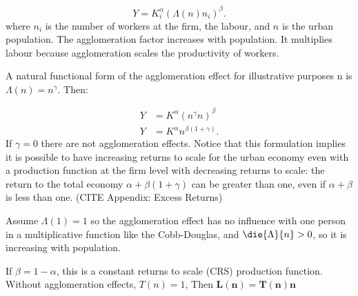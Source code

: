 \begin{equation} 
Y=K_i^{\alpha }(\Lambda(n)n_i)^{\beta }.
\label{Eqn:Prod1}
\end{equation} 
where $n_i$ is the number of workers at the firm, the labour, and $n$ is the urban population. The agglomeration factor increases with population. It multiplies labour because agglomeration scales the productivity of workers. 

A natural functional form of the agglomeration effect for illustrative purposes n is $\Lambda(n) = n^\gamma$. Then:

\begin{eqnarray}
 Y&=K^{\alpha }(n^{\gamma}n)^{\beta}  \nonumber\\
 Y&=K^{\alpha }n^{\beta(1 + \gamma)}.
 \label{Eqn:Prod2}
\end{eqnarray}
If $\gamma=0$ there are not agglomeration effects. Notice that  this formulation implies it is possible to have increasing returns to scale for the urban economy even with a production function at the firm level with decreasing returns to scale: the return to the total economy $\alpha + \beta(1 + \gamma)$ can be greater than one, even if $\alpha +\beta$ is less than one. %
(CITE Appendix: Excess Returns)

Assume $\Lambda(1)=1$ so the agglomeration effect has no influence with one person in a multiplicative function like the Cobb-Douglas, and $\die{\Lambda}{n}>0$, so it is increasing with population.

If $\beta=1-\alpha$, this is a constant returns to scale (CRS) production function. Without agglomeration effects, $T(n)=1$,  Then  \textbf{$\mathbf{L(n) = T(n) n}$} 



